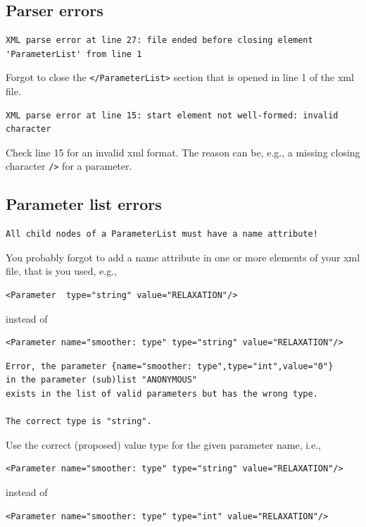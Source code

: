 \documentclass[10pt,fleqn]{book}
\begin{document}
\subsection{Parser errors}
\begin{cBox}
\begin{lstlisting}
XML parse error at line 27: file ended before closing element 'ParameterList' from line 1
\end{lstlisting}
\end{cBox}
Forgot to close the \verb|</ParameterList>| section that is opened in line 1 of the xml file.

\begin{cBox}
\begin{lstlisting}
XML parse error at line 15: start element not well-formed: invalid character
\end{lstlisting}
\end{cBox}
Check line 15 for an invalid xml format. The reason can be, e.g., a missing closing character \verb|/>| for a parameter.

\subsection{Parameter list errors}
\begin{cBox}
\begin{lstlisting}
All child nodes of a ParameterList must have a name attribute!
\end{lstlisting}
\end{cBox}
You probably forgot to add a name attribute in one or more elements of your xml file, that is you used, e.g.,
\begin{lstlisting}
<Parameter  type="string" value="RELAXATION"/>
\end{lstlisting}
instead of
\begin{lstlisting}
<Parameter name="smoother: type" type="string" value="RELAXATION"/>
\end{lstlisting}



\begin{cBox}
\begin{lstlisting}
Error, the parameter {name="smoother: type",type="int",value="0"}
in the parameter (sub)list "ANONYMOUS"
exists in the list of valid parameters but has the wrong type.

The correct type is "string".
\end{lstlisting}
\end{cBox}
Use the correct (proposed) value type for the given parameter name, i.e.,
\begin{lstlisting}
<Parameter name="smoother: type" type="string" value="RELAXATION"/>
\end{lstlisting}
instead of
\begin{lstlisting}
<Parameter name="smoother: type" type="int" value="RELAXATION"/>
\end{lstlisting}
\end{document}

